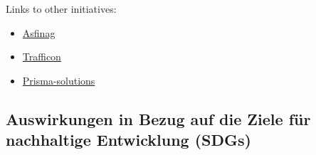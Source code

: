 \documentclass[
]{book}
\providecommand{\tightlist}{%
  \setlength{\itemsep}{0pt}\setlength{\parskip}{0pt}}
\begin{document}
Links to other initiatives:

\begin{itemize}
\tightlist
\item
  \href{http://services.asfinag.at/web/trafficdata/asfinag-content}{Asfinag}
\item
  \href{https://www.trafficon.eu}{Trafficon}
\item
  \href{https://www.prisma-solutions.com}{Prisma-solutions}
\end{itemize}

\hypertarget{auswirkungen-in-bezug-auf-die-ziele-fuxfcr-nachhaltige-entwicklung-sdgs-11}{%
\subsection*{Auswirkungen in Bezug auf die Ziele für nachhaltige Entwicklung (SDGs)}\label{auswirkungen-in-bezug-auf-die-ziele-fuxfcr-nachhaltige-entwicklung-sdgs-11}}
\end{document}
